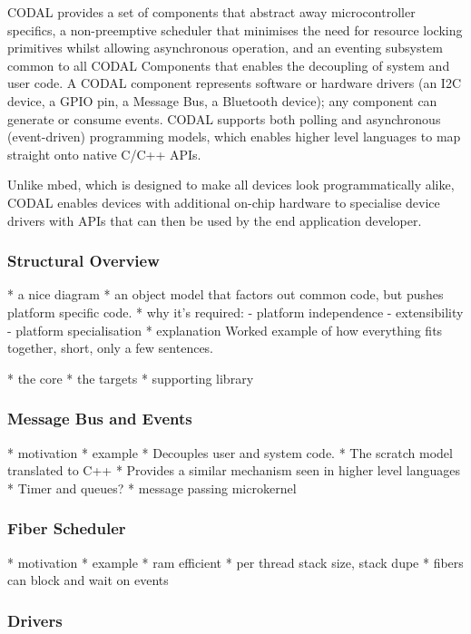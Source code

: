 CODAL provides a set of components that abstract away microcontroller specifics, a non-preemptive scheduler that minimises the need for resource locking primitives whilst allowing asynchronous operation, and an eventing subsystem common to all CODAL Components that enables the decoupling of system and user code. A CODAL component represents software or hardware drivers (an I2C device, a GPIO pin, a Message Bus, a Bluetooth device); any component can generate or consume events. CODAL supports both polling and asynchronous (event-driven) programming models, which enables higher level languages to map straight onto native C/C++ APIs.

Unlike mbed, which is designed to make all devices look programmatically alike, CODAL enables devices with additional on-chip hardware to specialise device drivers with APIs that can then be used by the end application developer.


\subsubsection{Structural Overview}

* a nice diagram
* an object model that factors out common code, but pushes platform specific code.
* why it's required:
    - platform independence
    - extensibility
    - platform specialisation
* explanation
Worked example of how everything fits together, short, only a few sentences.

* the core
* the targets
* supporting library

\subsubsection{Message Bus and Events}

* motivation
* example
* Decouples user and system code.
* The scratch model translated to C++
* Provides a similar mechanism seen in higher level languages
* Timer and queues?
* message passing microkernel

\subsubsection{Fiber Scheduler}

* motivation
* example
* ram efficient
* per thread stack size, stack dupe
* fibers can block and wait on events

\subsubsection{Drivers}

